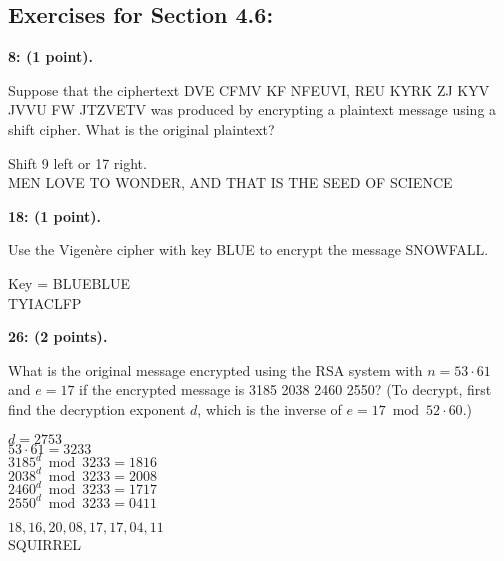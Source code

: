 \documentclass[12pt]{article}  %
\begin{document}
\clearpage
\subsection*{Exercises for Section 4.6:}     

\noindent
{\bf 8: (1 point).}

\noindent
Suppose that the ciphertext DVE CFMV KF NFEUVI, REU KYRK ZJ KYV JVVU FW JTZVETV was produced by encrypting a plaintext message using a shift cipher. What is the original plaintext?

\noindent
Shift 9 left or 17 right.\\
MEN LOVE TO WONDER, AND THAT IS THE SEED OF SCIENCE

\noindent
{\bf 18: (1 point).}

\noindent
Use the Vigen\`ere cipher with key BLUE to encrypt the message SNOWFALL.

\noindent
Key = BLUEBLUE\\
TYIACLFP

\noindent
{\bf 26: (2 points).}

\noindent
What is the original message encrypted using the RSA system with $n=53\cdot61$ and $e=17$ if the encrypted message is 3185 2038 2460 2550? (To decrypt, first find the decryption exponent $d$, which is the inverse of $e=17\bmod{52\cdot60}$.)

\noindent
$d=2753$\\
$53\cdot61=3233$\\
$3185^{d}\bmod{3233}=1816$\\
$2038^{d}\bmod{3233}=2008$\\
$2460^{d}\bmod{3233}=1717$\\
$2550^{d}\bmod{3233}=0411$

\noindent
$18,16,20,08,17,17,04,11$\\
SQUIRREL
\end{document}
